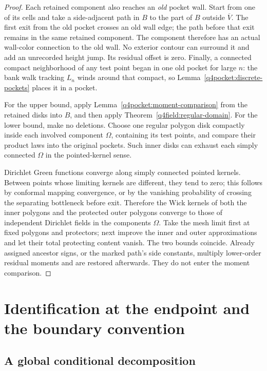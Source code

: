 \begin{proof}
Each retained component also reaches an \emph{old} pocket wall.
Start from one of its cells and take a side-adjacent path in
$B$ to the part of $B$ outside $\overline V$.  The first exit
from the old pocket crosses an old wall edge; the path before
that exit remains in the same retained component.  The component
therefore has an actual wall-color connection to the old wall.
No exterior contour can surround it and add an unrecorded
height jump.  Its residual offset is zero.  Finally, a connected
compact neighborhood of any test point began in one old pocket
for large $n$: the bank walk tracking $L_n$ winds around that
compact, so Lemma~\ref{q4pocket:discrete-pockets} places it in
a pocket.

For the upper bound, apply
Lemma~\ref{q4pocket:moment-comparison} from the retained disks
into $B$, and then apply
Theorem~\ref{q4field:regular-domain}.  For the lower bound,
make no deletions.  Choose one regular polygon disk compactly
inside each involved component $\Omega$, containing its test
points, and compare their product laws into the original
pockets.  Such inner disks can exhaust each simply connected
$\Omega$ in the pointed-kernel sense.

Dirichlet Green functions converge along simply connected
pointed kernels.  Between points whose limiting kernels are
different, they tend to zero; this follows by conformal mapping
convergence, or by the vanishing probability of crossing the
separating bottleneck before exit.  Therefore the Wick kernels
of both the inner polygons and the protected outer polygons
converge to those of independent Dirichlet fields in the
components $\Omega$.  Take the mesh limit first at fixed
polygons and protectors; next improve the inner and outer
approximations and let their total protecting content vanish.
The two bounds coincide.  Already assigned ancestor signs, or
the marked path's side constants, multiply lower-order residual
moments and are restored afterwards.  They do not enter the
moment comparison.
\end{proof}

\section{Identification at the endpoint and the boundary convention}
\label{sec:q4identification}

\subsection{A global conditional decomposition}

